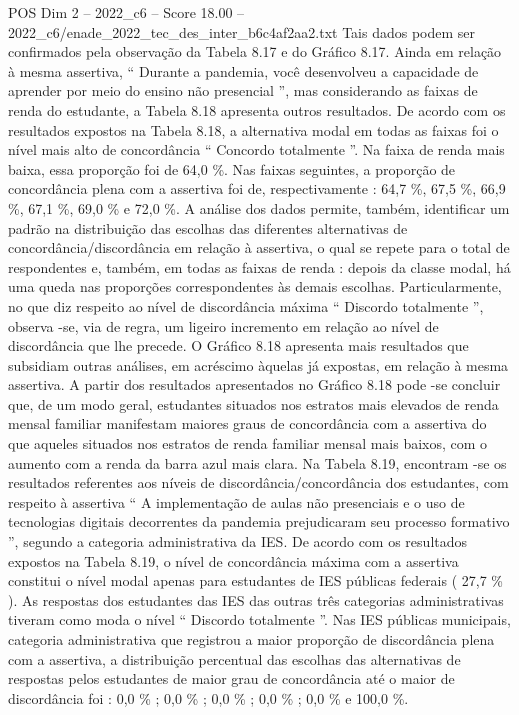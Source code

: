 \begin{textsample}{POS Dim 2 – 2022\_c6 – Score 18.00 – 2022\_c6/enade\_2022\_tec\_des\_inter\_b6c4af2aa2.txt}
Tais dados podem ser confirmados pela observação da Tabela 8.17 e do Gráfico 8.17.
Ainda em relação à mesma assertiva, “ Durante a pandemia, você desenvolveu a capacidade de aprender por meio do ensino não presencial ”, mas considerando as faixas de renda do estudante, a Tabela 8.18 apresenta outros resultados.
De acordo com os resultados expostos na Tabela 8.18, a alternativa modal em todas as faixas foi o nível mais alto de concordância “ Concordo totalmente ”.
Na faixa de renda mais baixa, essa proporção foi de 64,0 \%.
Nas faixas seguintes, a proporção de concordância plena com a assertiva foi de, respectivamente : 64,7 \%, 67,5 \%, 66,9 \%, 67,1 \%, 69,0 \% e 72,0 \%.
A análise dos dados permite, também, identificar um padrão na distribuição das escolhas das diferentes alternativas de concordância/discordância em relação à assertiva, o qual se repete para o total de respondentes e, também, em todas as faixas de renda : depois da classe modal, há uma queda nas proporções correspondentes às demais escolhas.
Particularmente, no que diz respeito ao nível de discordância máxima “ Discordo totalmente ”, observa -se, via de regra, um ligeiro incremento em relação ao nível de discordância que lhe precede.
O Gráfico 8.18 apresenta mais resultados que subsidiam outras análises, em acréscimo àquelas já expostas, em relação à mesma assertiva.
A partir dos resultados apresentados no Gráfico 8.18 pode -se concluir que, de um modo geral, estudantes situados nos estratos mais elevados de renda mensal familiar manifestam maiores graus de concordância com a assertiva do que aqueles situados nos estratos de renda familiar mensal mais baixos, com o aumento com a renda da barra azul mais clara.
Na Tabela 8.19, encontram -se os resultados referentes aos níveis de discordância/concordância dos estudantes, com respeito à assertiva “ A implementação de aulas não presenciais e o uso de tecnologias digitais decorrentes da pandemia prejudicaram seu processo formativo ”, segundo a categoria administrativa da IES.
De acordo com os resultados expostos na Tabela 8.19, o nível de concordância máxima com a assertiva constitui o nível modal apenas para estudantes de IES públicas federais ( 27,7 \% ).
As respostas dos estudantes das IES das outras três categorias administrativas tiveram como moda o nível “ Discordo totalmente ”.
Nas IES públicas municipais, categoria administrativa que registrou a maior proporção de discordância plena com a assertiva, a distribuição percentual das escolhas das alternativas de respostas pelos estudantes de maior grau de concordância até o maior de discordância foi : 0,0 \% ; 0,0 \% ; 0,0 \% ; 0,0 \% ; 0,0 \% e 100,0 \%.

\end{textsample}
